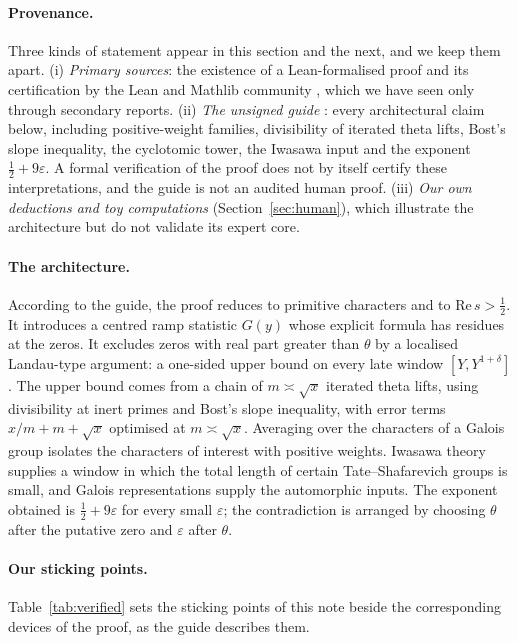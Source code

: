 \documentclass[11pt,a4paper]{article}
\theoremstyle{definition}\newtheorem{definition}[proposition]{Definition}
\theoremstyle{remark}\newtheorem{remark}[proposition]{Remark}
\begin{document}
\paragraph{Provenance.} Three kinds of statement appear in this section and the next, and we keep them apart. (i) \emph{Primary sources}: the existence of a Lean-formalised proof and its certification by the Lean and Mathlib community \cite{Alpoge2026,LeanStatement2026}, which we have seen only through secondary reports. (ii) \emph{The unsigned guide} \cite{Guide2026}: every architectural claim below, including positive-weight families, divisibility of iterated theta lifts, Bost's slope inequality, the cyclotomic tower, the Iwasawa input and the exponent $\tfrac12+9\varepsilon$. A formal verification of the proof does not by itself certify these interpretations, and the guide is not an audited human proof. (iii) \emph{Our own deductions and toy computations} (Section~\ref{sec:human}), which illustrate the architecture but do not validate its expert core.

\paragraph{The architecture.} According to the guide, the proof reduces to primitive characters and to $\mathrm{Re}\,s>\tfrac12$. It introduces a centred ramp statistic $G(y)$ whose explicit formula has residues at the zeros. It excludes zeros with real part greater than $\theta$ by a localised Landau-type argument: a one-sided upper bound on every late window $[Y,Y^{1+\delta}]$. The upper bound comes from a chain of $m\asymp\sqrt x$ iterated theta lifts, using divisibility at inert primes and Bost's slope inequality, with error terms $x/m+m+\sqrt x$ optimised at $m\asymp\sqrt x$. Averaging over the characters of a Galois group isolates the characters of interest with positive weights. Iwasawa theory supplies a window in which the total length of certain Tate--Shafarevich groups is small, and Galois representations supply the automorphic inputs. The exponent obtained is $\tfrac12+9\varepsilon$ for every small $\varepsilon$; the contradiction is arranged by choosing $\theta$ after the putative zero and $\varepsilon$ after $\theta$.

\paragraph{Our sticking points.} Table~\ref{tab:verified} sets the sticking points of this note beside the corresponding devices of the proof, as the guide describes them.
\end{document}
